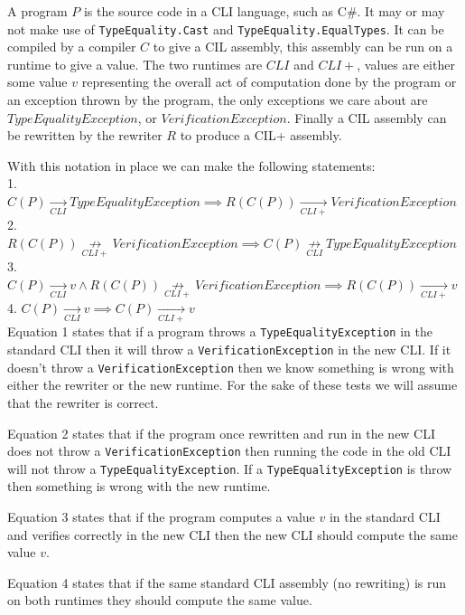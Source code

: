 \documentclass[english]{report}
\begin{document}
A program $P$ is the source code in a CLI language, such as C\#. It may or may
not make use of \texttt{TypeEquality.Cast} and
\texttt{TypeEquality.EqualTypes}. It can be compiled by a compiler $C$ to give
a CIL assembly, this assembly can be run on a runtime to give a value. The two
runtimes are $CLI$ and $CLI+$, values are either some value $v$ representing
the overall act of computation done by the program or an exception thrown by
the program, the only exceptions we care about are $TypeEqualityException$, or
$VerificationException$.  Finally a CIL assembly can be rewritten by the
rewriter $R$ to produce a CIL+ assembly.

With this notation in place we can make the following statements:\\
1. $C(P) \underset{CLI}{\rightarrow} TypeEqualityException \implies R(C(P))
\underset{CLI+}{\rightarrow} VerificationException$\\
2. $R(C(P)) \underset{CLI+}{\not\rightarrow} VerificationException \implies
C(P) \underset{CLI}{\not\rightarrow} TypeEqualityException$\\
3. $C(P) \underset{CLI}{\rightarrow} v \wedge R(C(P))
\underset{CLI+}{\not\rightarrow} VerificationException \implies R(C(P))
\underset{CLI+}{\rightarrow} v$\\
4. $C(P) \underset{CLI}{\rightarrow} v \implies C(P)
\underset{CLI+}{\rightarrow} v$\\

Equation 1 states that if a program throws a \texttt{TypeEqualityException} in
the standard CLI then it will throw a \texttt{VerificationException} in the new
CLI. If it doesn't throw a \texttt{VerificationException} then we know
something is wrong with either the rewriter or the new runtime. For the sake of
these tests we will assume that the rewriter is correct.

Equation 2 states that if the program once rewritten and run in the new CLI
does not throw a \texttt{VerificationException} then running the code in the
old CLI will not throw a \texttt{TypeEqualityException}. If a
\texttt{TypeEqualityException} is throw then something is wrong with the new
runtime.

Equation 3 states that if the program computes a value $v$ in the standard CLI
and verifies correctly in the new CLI then the new CLI should compute the same
value $v$.

Equation 4 states that if the same standard CLI assembly (no rewriting) is run
on both runtimes they should compute the same value.
\end{document}
